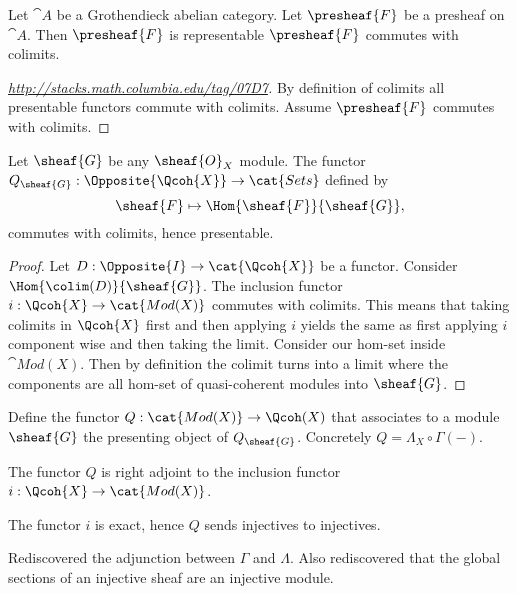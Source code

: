 \begin{lemma}
Let $\cat{A}$ be a Grothendieck abelian category.
Let $\presheaf{F}$ be a presheaf on $\cat{A}$.
Then $\presheaf{F}$ is representable \iff $\presheaf{F}$ commutes with colimits.
\end{lemma}
\begin{proof}[\url{http://stacks.math.columbia.edu/tag/07D7}]
By definition of colimits all presentable functors commute with colimits. 
Assume $\presheaf{F}$ commutes with colimits.


\end{proof}

\begin{lemma}
Let $\sheaf{G}$ be any $\sheaf{O}_X$ module. 
The functor $Q_{\sheaf{G}}:\Opposite{\Qcoh{X}}\rightarrow \cat{Sets}$ defined by
\[\sheaf{F}\mapsto \Hom{\sheaf{F}}{\sheaf{G}},\]
commutes with colimits, hence presentable.
\end{lemma}
\begin{proof}
Let $D:\Opposite{I}\rightarrow \cat{\Qcoh{X}}$ be a functor. 
Consider $\Hom{\colim(D)}{\sheaf{G}}$. The inclusion functor $i:\Qcoh{X}\rightarrow \cat{Mod(X)}$ commutes with colimits. This means that taking colimits in $\Qcoh{X}$ first and then applying $i$ yields the same as first applying $i$ component wise and then taking the limit.
Consider our hom-set inside $\cat{Mod(X)}$. Then by definition the colimit turns into a limit where the components are all hom-set of quasi-coherent modules into $\sheaf{G}$. 
\end{proof}

\begin{definition}
Define the functor $Q:\cat{Mod(X)}\rightarrow \Qcoh(X)$ that associates to a module $\sheaf{G}$ the presenting object of $Q_{\sheaf{G}}$.
Concretely $Q= \Lambda_X \circ \Gamma(-)$.
\end{definition}

\begin{lemma}
The functor $Q$ is right adjoint to the inclusion functor $i:\Qcoh{X}\rightarrow \cat{Mod(X)}$.
\end{lemma}

\begin{lemma}
The functor $i$ is exact, hence $Q$ sends injectives to injectives. 
\end{lemma}


\color{red}
Rediscovered the adjunction between $\Gamma$ and $\Lambda$. 
Also rediscovered that the global sections of an injective sheaf are an injective module.
\color{red}
